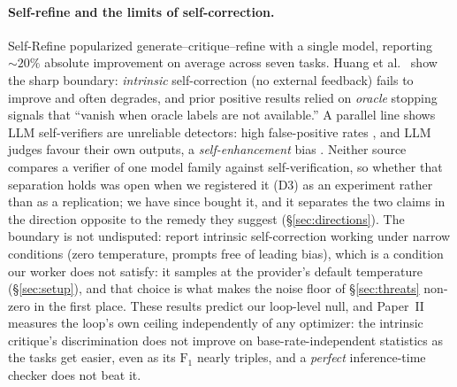 \documentclass[11pt]{article}
\begin{document}
\paragraph{Self-refine and the limits of self-correction.}
Self-Refine \citep{madaan2023selfrefine} popularized generate--critique--refine
with a single model, reporting ${\sim}20\%$ absolute improvement on average across seven tasks.
Huang et al.\ \citep{huang2023cannot} show the sharp boundary: \emph{intrinsic}
self-correction (no external feedback) fails to improve and often degrades, and prior positive
results relied on \emph{oracle} stopping signals that ``vanish when oracle labels are
not available.'' A parallel line shows LLM
self-verifiers are unreliable detectors: high false-positive rates
\citep{valmeekam2023selfcritique}, and LLM judges favour their own outputs, a
\emph{self-enhancement} bias \citep{zheng2023judging}. Neither source compares a verifier of one
model family against self-verification, so whether that separation holds was open when we
registered it (D3) as an experiment rather than as a replication; we have since bought it, and
it separates the two claims in the direction opposite to the remedy they suggest
(\S\ref{sec:directions}). The boundary is not undisputed:
\citet{liu2024intrinsic} report intrinsic self-correction working under narrow conditions
(zero temperature, prompts free of leading bias), which is a condition our worker does not
satisfy: it samples at the provider's default temperature (\S\ref{sec:setup}), and that
choice is what makes the noise floor of \S\ref{sec:threats} non-zero in the first place.
These results predict our loop-level null, and Paper~II measures the loop's own ceiling
independently of any optimizer: the intrinsic critique's discrimination does not improve on
base-rate-independent statistics as the tasks get easier, even as its $\mathrm{F}_1$ nearly triples,
and a \emph{perfect} inference-time checker does not beat it.
\end{document}
